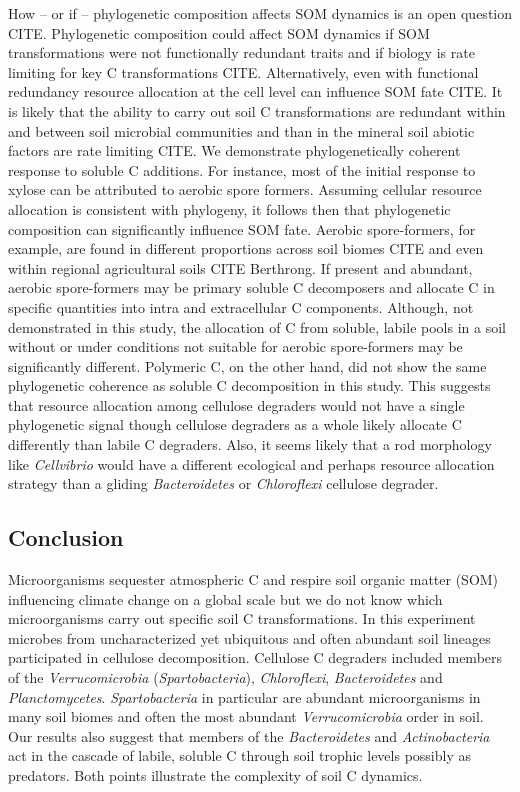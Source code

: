 How -- or if -- phylogenetic composition affects SOM dynamics is an open
question CITE. Phylogenetic composition could affect SOM dynamics if SOM
transformations were not functionally redundant traits and if biology is rate
limiting for key C transformations CITE. Alternatively, even with functional
redundancy resource allocation at the cell level can influence SOM fate CITE.
It is likely that the ability to carry out soil C transformations are redundant
within and between soil microbial communities and than in the mineral soil
abiotic factors are rate limiting CITE. We demonstrate
phylogenetically coherent response to soluble C additions. For instance, most
of the initial response to xylose can be attributed to aerobic spore formers.
Assuming cellular resource allocation is consistent with phylogeny, it follows
then that phylogenetic composition can significantly influence
SOM fate. Aerobic spore-formers, for example, are found in different
proportions across soil biomes CITE and even within regional agricultural soils
CITE Berthrong. If present and abundant, aerobic spore-formers may be primary
soluble C decomposers and allocate C in specific quantities into intra and
extracellular C components. Although, not demonstrated in this study, the
allocation of C from soluble, labile pools in a soil without or under
conditions not suitable for aerobic spore-formers may be significantly
different. Polymeric C, on the other hand, did not show the same phylogenetic
coherence as soluble C decomposition in this study. This suggests that resource
allocation among cellulose degraders would not have a single phylogenetic
signal though cellulose degraders as a whole likely allocate C differently
than labile C degraders. Also, it seems likely that a rod morphology
like \textit{Cellvibrio} would have a different ecological and perhaps resource
allocation strategy than a gliding \textit{Bacteroidetes} or
\textit{Chloroflexi} cellulose degrader.

\subsection{Conclusion} 
Microorganisms sequester atmospheric C and respire soil organic matter (SOM)
influencing climate change on a global scale but we do not know which
microorganisms carry out specific soil C transformations. In this experiment
microbes from uncharacterized yet ubiquitous and often abundant soil lineages
participated in cellulose decomposition. Cellulose C degraders included members
of the \textit{Verrucomicrobia} (\textit{Spartobacteria}),
\textit{Chloroflexi}, \textit{Bacteroidetes} and \textit{Planctomycetes}.
\textit{Spartobacteria} in particular are abundant microorganisms in many soil
biomes and often the most abundant \textit{Verrucomicrobia} order in soil. Our
results also suggest that members of the \textit{Bacteroidetes} and
\textit{Actinobacteria} act in the cascade of labile, soluble C through soil
trophic levels possibly as predators. Both points illustrate the complexity of
soil C dynamics.
